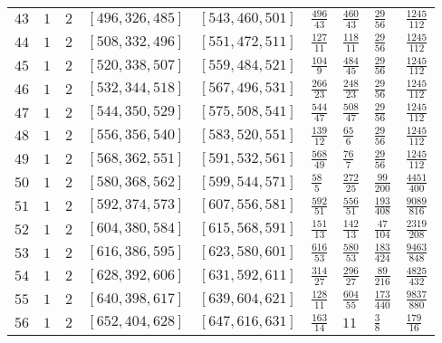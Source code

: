 \documentclass[12pt]{extarticle}
\begin{document}
\begin{longtable}{lllllllll}
$43$ & $1$ & $2$ & $\left[496, 326, 485\right]$ & $\left[543, 460, 501\right]$ & $\frac{496}{43}$ & $\frac{460}{43}$ & $\frac{29}{56}$ & $\frac{1245}{112}$ \\
$44$ & $1$ & $2$ & $\left[508, 332, 496\right]$ & $\left[551, 472, 511\right]$ & $\frac{127}{11}$ & $\frac{118}{11}$ & $\frac{29}{56}$ & $\frac{1245}{112}$ \\
$45$ & $1$ & $2$ & $\left[520, 338, 507\right]$ & $\left[559, 484, 521\right]$ & $\frac{104}{9}$ & $\frac{484}{45}$ & $\frac{29}{56}$ & $\frac{1245}{112}$ \\
$46$ & $1$ & $2$ & $\left[532, 344, 518\right]$ & $\left[567, 496, 531\right]$ & $\frac{266}{23}$ & $\frac{248}{23}$ & $\frac{29}{56}$ & $\frac{1245}{112}$ \\
$47$ & $1$ & $2$ & $\left[544, 350, 529\right]$ & $\left[575, 508, 541\right]$ & $\frac{544}{47}$ & $\frac{508}{47}$ & $\frac{29}{56}$ & $\frac{1245}{112}$ \\
$48$ & $1$ & $2$ & $\left[556, 356, 540\right]$ & $\left[583, 520, 551\right]$ & $\frac{139}{12}$ & $\frac{65}{6}$ & $\frac{29}{56}$ & $\frac{1245}{112}$ \\
$49$ & $1$ & $2$ & $\left[568, 362, 551\right]$ & $\left[591, 532, 561\right]$ & $\frac{568}{49}$ & $\frac{76}{7}$ & $\frac{29}{56}$ & $\frac{1245}{112}$ \\
$50$ & $1$ & $2$ & $\left[580, 368, 562\right]$ & $\left[599, 544, 571\right]$ & $\frac{58}{5}$ & $\frac{272}{25}$ & $\frac{99}{200}$ & $\frac{4451}{400}$ \\
$51$ & $1$ & $2$ & $\left[592, 374, 573\right]$ & $\left[607, 556, 581\right]$ & $\frac{592}{51}$ & $\frac{556}{51}$ & $\frac{193}{408}$ & $\frac{9089}{816}$ \\
$52$ & $1$ & $2$ & $\left[604, 380, 584\right]$ & $\left[615, 568, 591\right]$ & $\frac{151}{13}$ & $\frac{142}{13}$ & $\frac{47}{104}$ & $\frac{2319}{208}$ \\
$53$ & $1$ & $2$ & $\left[616, 386, 595\right]$ & $\left[623, 580, 601\right]$ & $\frac{616}{53}$ & $\frac{580}{53}$ & $\frac{183}{424}$ & $\frac{9463}{848}$ \\
$54$ & $1$ & $2$ & $\left[628, 392, 606\right]$ & $\left[631, 592, 611\right]$ & $\frac{314}{27}$ & $\frac{296}{27}$ & $\frac{89}{216}$ & $\frac{4825}{432}$ \\
$55$ & $1$ & $2$ & $\left[640, 398, 617\right]$ & $\left[639, 604, 621\right]$ & $\frac{128}{11}$ & $\frac{604}{55}$ & $\frac{173}{440}$ & $\frac{9837}{880}$ \\
$56$ & $1$ & $2$ & $\left[652, 404, 628\right]$ & $\left[647, 616, 631\right]$ & $\frac{163}{14}$ & $11$ & $\frac{3}{8}$ & $\frac{179}{16}$ \\

\end{longtable}
\end{document}

